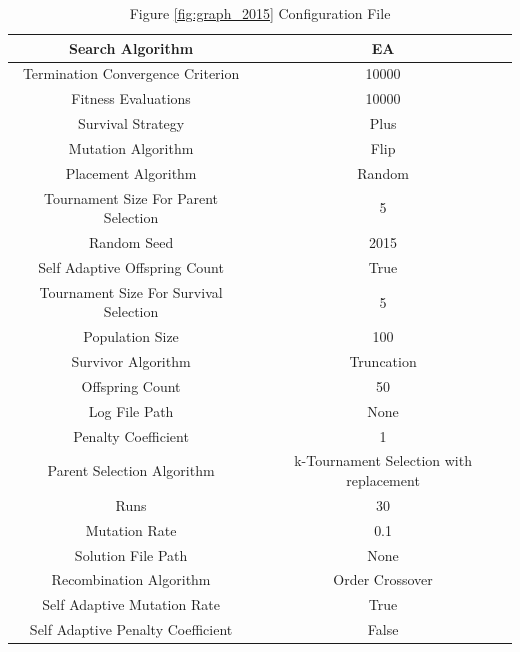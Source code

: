 \documentclass{standalone}
\begin{document}
\begin{table}[!htb]
	\centering
	\caption{Figure \ref{fig:graph_2015} Configuration File}
	\label{tab:graph_2015}
	\begin{tabular}{| c | c |}
		\hline
		Search Algorithm		& EA		 \\
		\hline
		Termination Convergence Criterion		& 10000		 \\
		\hline
		Fitness Evaluations		& 10000		 \\
		\hline
		Survival Strategy		& Plus		 \\
		\hline
		Mutation Algorithm		& Flip		 \\
		\hline
		Placement Algorithm		& Random		 \\
		\hline
		Tournament Size For Parent Selection		& 5		 \\
		\hline
		Random Seed		& 2015		 \\
		\hline
		Self Adaptive Offspring Count		& True		 \\
		\hline
		Tournament Size For Survival Selection		& 5		 \\
		\hline
		Population Size		& 100		 \\
		\hline
		Survivor Algorithm		& Truncation		 \\
		\hline
		Offspring Count		& 50		 \\
		\hline
		Log File Path		& None		 \\
		\hline
		Penalty Coefficient		& 1		 \\
		\hline
		Parent Selection Algorithm		& k-Tournament Selection with replacement		 \\
		\hline
		Runs		& 30		 \\
		\hline
		Mutation Rate		& 0.1		 \\
		\hline
		Solution File Path		& None		 \\
		\hline
		Recombination Algorithm		& Order Crossover		 \\
		\hline
		Self Adaptive Mutation Rate		& True		 \\
		\hline
		Self Adaptive Penalty Coefficient		& False		 \\
		\hline
	\end{tabular}
\end{table}
\end{document}

